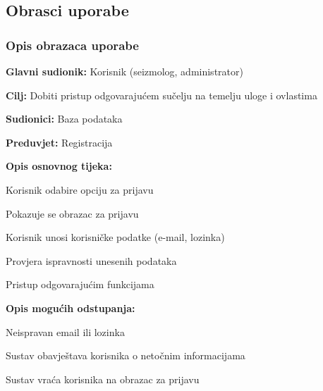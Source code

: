 			\eject 
			
			
				
			\subsection{Obrasci uporabe}
				
				\subsubsection{Opis obrazaca uporabe}					

					\noindent {}
					\begin{packed_item}
	
						\item \textbf{Glavni sudionik:} Korisnik (seizmolog, administrator)
						\item \textbf{Cilj:} Dobiti pristup odgovarajućem sučelju na temelju uloge i ovlastima
						\item \textbf{Sudionici:} Baza podataka
						\item \textbf{Preduvjet:} Registracija
						\item \textbf{Opis osnovnog tijeka:}
						
						\item[] \begin{packed_enum}
	
							\item Korisnik odabire opciju za prijavu
							\item Pokazuje se obrazac za prijavu
							\item Korisnik unosi korisničke podatke (e-mail, lozinka)
							\item Provjera ispravnosti unesenih podataka
							\item Pristup odgovarajućim funkcijama
						\end{packed_enum}
						
						\item  \textbf{Opis mogućih odstupanja:}
						
						\item[] \begin{packed_item}
	
							\item[4.a] Neispravan email ili lozinka
							\item[] \begin{packed_enum}
								
								\item Sustav obavještava korisnika o netočnim informacijama
								\item Sustav vraća korisnika na obrazac za prijavu
								
							\end{packed_enum}
							
						\end{packed_item}
					\end{packed_item}

